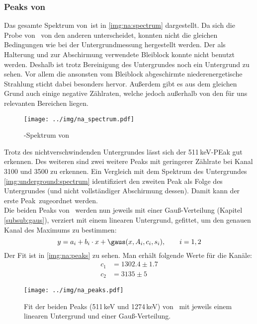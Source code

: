 \subsubsection{Peaks von \na}
\label{subsub:eval:na}
Das gesamte Spektrum von \na\,ist in \autoref{img:na:spectrum} dargestellt. Da sich die Probe von \na\, von den anderen unterscheidet, konnten nicht die 
gleichen Bedingungen wie bei der Untergrundmessung hergestellt werden. Der als Halterung und zur Abschirmung verwendete Bleiblock konnte nicht 
benutzt werden. Deshalb ist trotz Bereinigung des Untergrundes noch ein Untergrund zu sehen. Vor allem die ansonsten vom Bleiblock abgeschirmte 
niederenergetische Strahlung sticht dabei besonders hervor. Außerdem gibt es aus dem gleichen Grund auch einige negative Zählraten, welche jedoch 
außerhalb von den für uns relevanten Bereichen liegen.
\begin{figure}[H]
\begin{center}
  \texttt{[image: ../img/na\_spectrum.pdf]}
  \caption{\textgamma-Spektrum von }
  \label{img:na:spectrum}
\end{center}
\end{figure}
Trotz des nichtverschwindenden Untergrundes lässt sich der 511\,keV-PEak gut erkennen. Des weiteren sind zwei weitere Peaks mit geringerer 
Zählrate bei Kanal 3100 und 3500 zu erkennen. Ein Vergleich mit dem Spektrum des Untergrundes \autoref{img:underground:spectrum} identifiziert 
den zweiten Peak als Folge des Untergrundes (und nicht vollständiger Abschirmung dessen). Damit kann der erste Peak \na\,zugeordnet werden.\\[\baselineskip]
Die beiden Peaks von \na\, werden nun jeweils mit einer Gauß-Verteilung (Kapitel \ref{subsub:gaus}), verziert mit einem linearen Untergrund, 
gefittet, um den genauen Kanal des Maximums zu bestimmen:
\begin{equation}
  y = a_i + b_i \cdot x + \gaus(x, A_i, c_i, s_i), \qquad i = 1, 2
\end{equation}
Der Fit ist in \autoref{img:na:peaks} zu sehen. Man erhält folgende Werte für die Kanäle:
\begin{equation}
\begin{split}
  \label{eq:na:channels}
  c_1 &= 1302.4  \pm 1.7 \\
  c_2 &= 3135  \pm 5 
\end{split}
\end{equation}
\begin{figure}[H]
\begin{center}
  \texttt{[image: ../img/na\_peaks.pdf]}
  \caption{Fit der beiden Peaks (511\,keV und 1274\,keV) von \na\, mit jeweils einem linearen Untergrund und einer Gauß-Verteilung.}
  \label{img:na:peaks}
\end{center}
\end{figure}

